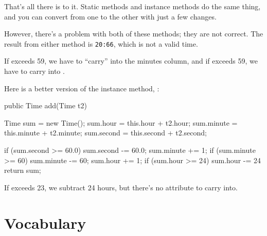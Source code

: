 
That's all there is to it.
Static methods and instance methods do the same thing, and you can convert from one to the other with just a few changes.


However, there's a problem with both of these methods; they are not correct.
The result from either method is {\tt 20:66}, which is not a valid time.

If  exceeds 59, we have to ``carry'' into the minutes column, and if  exceeds 59, we have to carry into .

Here is a better version of the instance method, :

\begin{code}
public Time add(Time t2) {
    Time sum = new Time();
    sum.hour = this.hour + t2.hour;
    sum.minute = this.minute + t2.minute;
    sum.second = this.second + t2.second;

    if (sum.second >= 60.0) {
        sum.second -= 60.0;
        sum.minute += 1;
    }
    if (sum.minute >= 60) {
        sum.minute -= 60;
        sum.hour += 1;
    }
    if (sum.hour >= 24) {
        sum.hour -= 24
    }
    return sum;
}
\end{code}

If  exceeds 23, we subtract 24 hours, but there's no
 attribute to carry into.


\section{Vocabulary}

